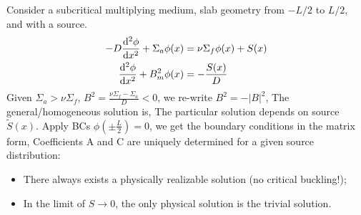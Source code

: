 \documentclass{school-22.211-notes}
\begin{document}
\clearpage
{} \label{one-group-source-problem-subcritical}
Consider a subcritical multiplying medium, slab geometry from $-L/2$ to $L/2$, and with a source. 
\begin{align}
  - D \frac{\mathrm{d}^{2}\phi}{\mathrm{d}x^{2}} + \Sigma_a \phi(x) &= \nu \Sigma_f \phi(x) + S(x) \\
  \frac{\mathrm{d}^{2}\phi}{\mathrm{d}x^{2}} + B_m^2 \phi(x) &= -\frac{S(x)}{D} 
\end{align}
Given $\Sigma_a > \nu \Sigma_f$, $B^2 = \frac{\nu \Sigma_f - \Sigma_a}{D} < 0 $, we re-write $B^2 = - |B|^2$,
The general/homogeneous solution is,
The particular solution depends on source $\tilde{S}(x)$. Apply BCs $\phi \left( \pm \frac{L}{2} \right) = 0$, we get the boundary conditions in the matrix form,
Coefficients A and C are uniquely determined for a given source distribution: 
\begin{itemize}
\item There always exists a physically realizable solution (no critical buckling!);
\item In the limit of $S\to 0$, the only physical solution is the trivial solution. 
\end{itemize}
\end{document}
